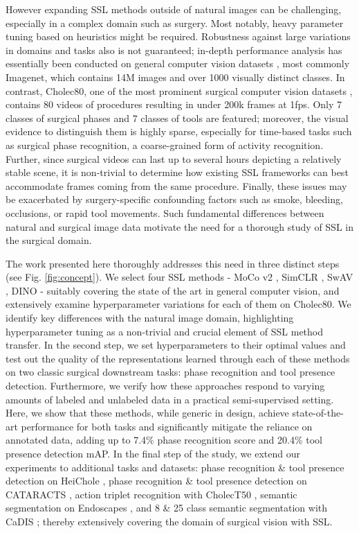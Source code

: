 \documentclass[times,twocolumn,final]{elsarticle}
\begin{document}
However expanding SSL methods outside of natural images can be challenging, especially in a complex domain such as surgery. Most notably, heavy parameter tuning based on heuristics \citep{xiao2020should} might be required. Robustness against large variations in domains and tasks also is not guaranteed; in-depth performance analysis has essentially been conducted on general computer vision datasets \citep{feichtenhofer2021large}, most commonly Imagenet, which contains 14M images and over 1000 visually distinct classes. In contrast, Cholec80, one of the most prominent surgical computer vision datasets \citep{sds}, contains 80 videos of procedures resulting in under 200k frames at 1fps. Only 7 classes of surgical phases and 7 classes of tools are featured; moreover, the visual evidence to distinguish them is highly sparse, especially for time-based tasks such as surgical phase recognition, a coarse-grained form of activity recognition. Further, since surgical videos can last up to several hours depicting a relatively stable scene, it is non-trivial to determine how existing SSL frameworks can best accommodate frames coming from the same procedure. Finally, these issues may be exacerbated by surgery-specific confounding factors such as smoke, bleeding, occlusions, or rapid tool movements. Such fundamental differences between natural and surgical image data motivate the need for a thorough study of SSL in the surgical domain.

The work presented here thoroughly addresses this need in {\color{changetext} three} distinct steps (see Fig. \ref{fig:concept}). We select four SSL methods - MoCo v2 \citep{chen2020improved}, SimCLR \citep{chen2020simple}, SwAV \citep{caron2020unsupervised}, DINO \citep{caron2021emerging} - suitably covering the state of the art in general computer vision, and extensively examine hyperparameter variations for each of them on Cholec80. We identify key differences with the natural image domain, highlighting hyperparameter tuning as a non-trivial and crucial element of SSL method transfer. In the second step, we set hyperparameters to their optimal values and test out the quality of the representations learned through each of these methods on two classic surgical downstream tasks: phase recognition and tool presence detection. \textcolor{changetext}{Furthermore, we} verify how these approaches respond to varying amounts of labeled and unlabeled data in a practical semi-supervised setting. Here, we show that these methods, while generic in design, achieve state-of-the-art performance for both tasks and significantly mitigate the reliance on annotated data, adding up to {\color{changetext}7.4\%} phase recognition  score and 20.4\% tool presence detection mAP. {\color{newtext} In the final step of the study, we extend our experiments to additional tasks and datasets: phase recognition \& tool presence detection on HeiChole \citep{heichole}, phase recognition \& tool presence detection on CATARACTS \citep{al2019cataracts}, action triplet recognition with CholecT50 \citep{rdv}, semantic segmentation on Endoscapes \citep{endoscapes}, and 8 \& 25 class semantic segmentation with CaDIS \citep{cadis}; thereby extensively covering the domain of surgical vision with SSL.}
\end{document}
